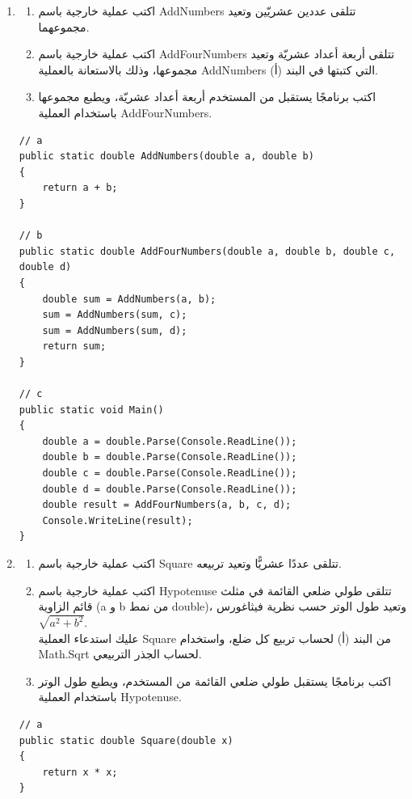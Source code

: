 \documentclass[14pt]{extarticle}
\begin{document}
\begin{enumerate}[resume, itemsep=2em]

\item
\begin{enumerate}
    \item اكتب عملية خارجية باسم \textenglish{AddNumbers} تتلقى عددين عشريّين وتعيد مجموعهما.
    \item اكتب عملية خارجية باسم \textenglish{AddFourNumbers} تتلقى أربعة أعداد عشريّة وتعيد مجموعها، وذلك بالاستعانة بالعملية \textenglish{AddNumbers} التي كتبتها في البند (أ).
    \item اكتب برنامجًا يستقبل من المستخدم أربعة أعداد عشريّة، ويطبع مجموعها باستخدام العملية \textenglish{AddFourNumbers}.
\end{enumerate}
\ifwithsols
\begin{boxSolution}
\begin{english}
\begin{verbatim}
// a
public static double AddNumbers(double a, double b)
{
    return a + b;
}

// b
public static double AddFourNumbers(double a, double b, double c, double d)
{
    double sum = AddNumbers(a, b);
    sum = AddNumbers(sum, c);
    sum = AddNumbers(sum, d);
    return sum;
}

// c
public static void Main()
{
    double a = double.Parse(Console.ReadLine());
    double b = double.Parse(Console.ReadLine());
    double c = double.Parse(Console.ReadLine());
    double d = double.Parse(Console.ReadLine());
    double result = AddFourNumbers(a, b, c, d);
    Console.WriteLine(result);
}
\end{verbatim}
\end{english}
\end{boxSolution}
\fi
\filbreak

\item
\begin{enumerate}
    \item اكتب عملية خارجية باسم \textenglish{Square} تتلقى عددًا عشريًّا وتعيد تربيعه.
    \item اكتب عملية خارجية باسم \textenglish{Hypotenuse} تتلقى طولي ضلعي القائمة في مثلث قائم الزاوية (\textenglish{a} و \textenglish{b} من نمط \textenglish{double})، وتعيد طول الوتر حسب نظرية فيثاغورس $\sqrt{a^2 + b^2}$. \\
    عليك استدعاء العملية \textenglish{Square} من البند (أ) لحساب تربيع كل ضلع، واستخدام \textenglish{Math.Sqrt} لحساب الجذر التربيعي.
    \item اكتب برنامجًا يستقبل طولي ضلعي القائمة من المستخدم، ويطبع طول الوتر باستخدام العملية \textenglish{Hypotenuse}.
\end{enumerate}
\ifwithsols
\begin{boxSolution}
\begin{english}
\begin{verbatim}
// a
public static double Square(double x)
{
    return x * x;
}


\end{verbatim}
\end{english}
\end{boxSolution}
\end{enumerate}
\end{document}
